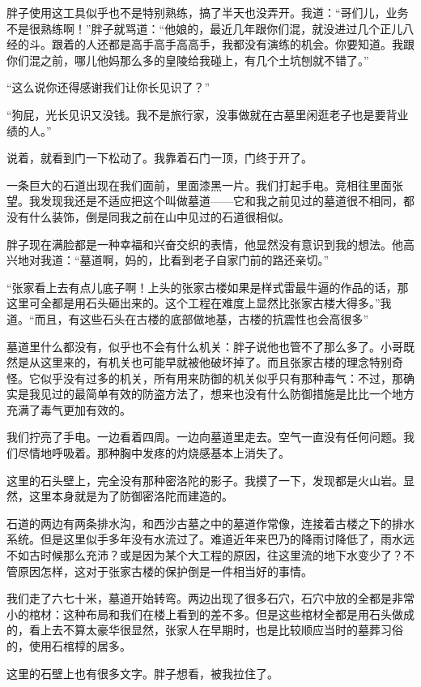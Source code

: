 胖子使用这工具似乎也不是特别熟练，搞了半天也没弄开。我道：“哥们儿，业务不是很熟练啊！”胖子就骂道：“他娘的，最近几年跟你们混，就没进过几个正儿八经的斗。跟着的人还都是高手高手高高手，我都没有演练的机会。你要知道。我跟你们混之前，哪儿他妈那么多的皇陵给我碰上，有几个土坑刨就不错了。”

“这么说你还得感谢我们让你长见识了？”

“狗屁，光长见识又没钱。我不是旅行家，没事做就在古墓里闲逛老子也是要背业绩的人。”

说着，就看到门一下松动了。我靠着石门一顶，门终于开了。

一条巨大的石道出现在我们面前，里面漆黑一片。我们打起手电。竞相往里面张望。我发现我还是不适应把这个叫做墓道——它和我之前见过的墓道很不相同，都没有什么装饰，倒是同我之前在山中见过的石道很相似。

胖子现在满脸都是一种幸福和兴奋交织的表情，他显然没有意识到我的想法。他高兴地对我道：“墓道啊，妈的，比看到老子自家门前的路还亲切。”

“张家看上去有点儿底子啊！上头的张家古楼如果是样式雷最牛逼的作品的话，那这里可全都是用石头砸出来的。这个工程在难度上显然比张家古楼大得多。”我道。“而且，有这些石头在古楼的底部做地基，古楼的抗震性也会高很多”

墓道里什么都没有，似乎也不会有什么机关：胖子说他也管不了那么多了。小哥既然是从这里来的，有机关也可能早就被他破坏掉了。而且张家古楼的理念特别奇怪。它似乎没有过多的机关，所有用来防御的机关似乎只有那种毒气：不过，那确实是我见过的最简单有效的防盗方法了，想来也没有什么防御措施是比比一个地方充满了毒气更加有效的。

我们拧亮了手电。一边看着四周。一边向墓道里走去。空气一直没有任何问题。我们尽情地呼吸着。那种胸中发疼的灼烧感基本上消失了。

这里的石头壁上，完全没有那种密洛陀的影子。我摸了一下，发现都是火山岩。显然，这里本身就是为了防御密洛陀而建造的。

石道的两边有两条排水沟，和西沙古墓之中的墓道作常像，连接着古楼之下的排水系统。但是这里似手多年没有水流过了。难道近年来巴乃的降雨讨降低了，雨水远不如古时候那么充沛？或是因为某个大工程的原因，往这里流的地下水变少了？不管原因怎样，这对于张家古楼的保护倒是一件相当好的事情。

我们走了六七十米，墓道开始转弯。两边出现了很多石穴，石穴中放的全都是非常小的棺材：这种布局和我们在楼上看到的差不多。但是这些棺材全都是用石头做成的，看上去不算太豪华很显然，张家人在早期时，也是比较顺应当时的墓葬习俗的，使用石棺椁的居多。

这里的石壁上也有很多文字。胖子想看，被我拉住了。

